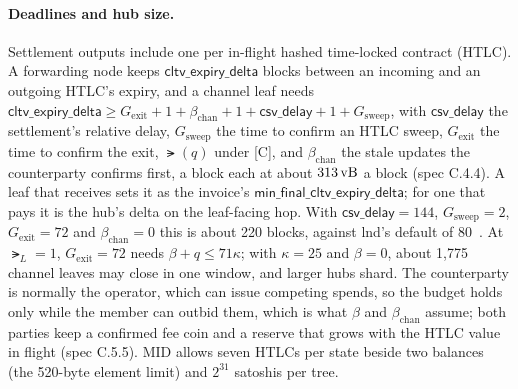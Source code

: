 
\paragraph{Deadlines and hub size.} Settlement outputs include one per
in-flight hashed time-locked contract (HTLC). A forwarding node keeps
$\mathsf{cltv\_expiry\_delta}$ blocks between an incoming and an outgoing
HTLC's expiry, and a channel leaf needs
$\mathsf{cltv\_expiry\_delta} \ge G_{\mathrm{exit}} + 1 + \beta_{\mathrm{chan}} + 1 + \mathsf{csv\_delay} + 1 + G_{\mathrm{sweep}}$,
with $\mathsf{csv\_delay}$ the settlement's relative delay,
$G_{\mathrm{sweep}}$ the time to confirm an HTLC sweep,
$G_{\mathrm{exit}}$ the time to confirm the exit, $\lat(q)$ under [C],
and $\beta_{\mathrm{chan}}$ the stale updates the counterparty confirms
first, a block each at about $313\,\mathrm{vB}$ a block (spec C.4.4). A leaf that
receives sets it as the invoice's
$\mathsf{min\_final\_cltv\_expiry\_delta}$; for one that pays it is the
hub's delta on the leaf-facing hop. With
$\mathsf{csv\_delay} = 144$, $G_{\mathrm{sweep}} = 2$,
$G_{\mathrm{exit}} = 72$ and $\beta_{\mathrm{chan}} = 0$ this is about
220 blocks, against lnd's default of 80~\cite{lnd}. At $\lat_L = 1$, $G_{\mathrm{exit}} = 72$ needs
$\beta + q \le 71\kappa$; with $\kappa = 25$ and $\beta = 0$, about
1{,}775 channel leaves may close in one window, and larger hubs shard.
The counterparty is normally the operator, which can issue competing
spends, so the budget holds only while the member can outbid them, which
is what $\beta$ and $\beta_{\mathrm{chan}}$ assume; both parties keep a
confirmed fee coin and a reserve that grows with the HTLC value in
flight (spec C.5.5).\iffullversion{} MID allows seven HTLCs per state beside two balances
(the 520-byte element limit) and $2^{31}$ satoshis per tree.\fi
